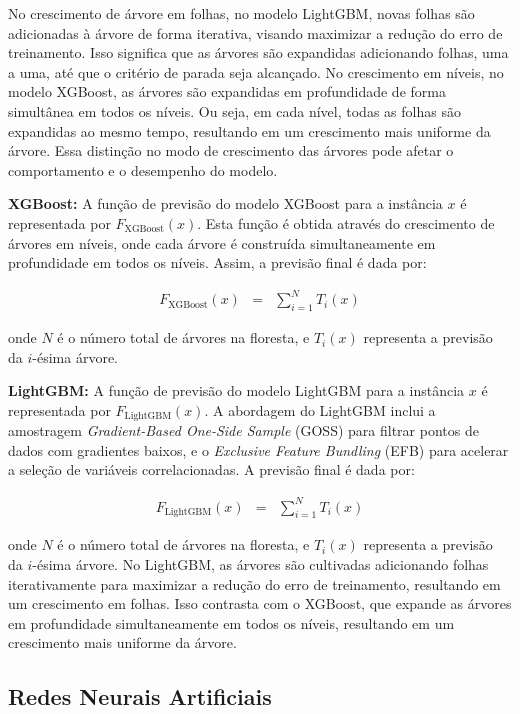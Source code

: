  
 No crescimento de árvore em folhas, no modelo LightGBM, novas folhas são adicionadas à árvore de forma iterativa, visando maximizar a redução do erro de treinamento. Isso significa que as árvores são expandidas adicionando folhas, uma a uma, até que o critério de parada seja alcançado.  No crescimento em níveis, no modelo XGBoost, as árvores são expandidas em profundidade de forma simultânea em todos os níveis. Ou seja, em cada nível, todas as folhas são expandidas ao mesmo tempo, resultando em um crescimento mais uniforme da árvore. Essa distinção no modo de crescimento das árvores pode afetar o comportamento e o desempenho do modelo. 
  
 \noindent\textbf{XGBoost:} 
 A função de previsão do modelo XGBoost para a instância $x$ é representada por $F_{\text{XGBoost}}(x)$. Esta função é obtida através do crescimento de árvores em níveis, onde cada árvore é construída simultaneamente em profundidade em todos os níveis. Assim, a previsão final é dada por:
 
 \begin{eqnarray}
 F_{\text{XGBoost}}(x) &=& \sum_{i=1}^{N} T_i(x)
 \end{eqnarray}
 
 \noindent onde $N$ é o número total de árvores na floresta, e $T_i(x)$ representa a previsão da $i$-ésima árvore.
 
\noindent\textbf{LightGBM:} 
 A função de previsão do modelo LightGBM para a instância $x$ é representada por $F_{\text{LightGBM}}(x)$. A abordagem do LightGBM inclui a amostragem \textit{Gradient-Based One-Side Sample} (GOSS) para filtrar pontos de dados com gradientes baixos, e o \textit{Exclusive Feature Bundling} (EFB) para acelerar a seleção de variáveis correlacionadas. A previsão final é dada por:
 

\begin{eqnarray}
	 F_{\text{LightGBM}}(x) &=& \sum_{i=1}^{N} T_i(x)
\end{eqnarray}

 
 \noindent onde $N$ é o número total de árvores na floresta, e $T_i(x)$ representa a previsão da $i$-ésima árvore. No LightGBM, as árvores são cultivadas adicionando folhas iterativamente para maximizar a redução do erro de treinamento, resultando em um crescimento em folhas. Isso contrasta com o XGBoost, que expande as árvores em profundidade simultaneamente em todos os níveis, resultando em um crescimento mais uniforme da árvore.
  
  
 \subsection{Redes Neurais Artificiais}
 
